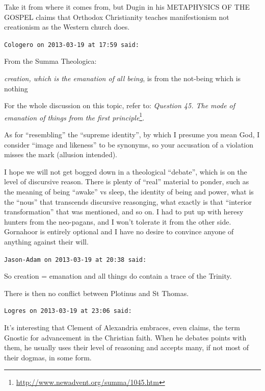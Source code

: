 \begin{footnotesize}
\begin{sffamily}
Take it from where it comes from, but Dugin in his METAPHYSICS OF THE GOSPEL claims that Orthodox Christianity teaches manifestionism not creationism as the Western church does.

\hfill

\texttt{Cologero on 2013-03-19 at 17:59 said:}

From the Summa Theologica:

\begin{quotex}

\emph{creation, which is the emanation of all being}, is from the not-being which is nothing
\end{quotex}

For the whole discussion on this topic, refer to: \textit{Question 45. The mode of emanation of things from the first principle}\footnote{\url{http://www.newadvent.org/summa/1045.htm}}.

As for ``resembling'' the ``supreme identity'', by which I presume you mean God, I consider ``image and likeness'' to be synonyms, so your accusation of a violation misses the mark (allusion intended).

I hope we will not get bogged down in a theological ``debate'', which is on the level of discursive reason. There is plenty of ``real'' material to ponder, such as the meaning of being ``awake'' vs sleep, the identity of being and power, what is the ``nous'' that transcends discursive reasonging, what exactly is that ``interior transformation'' that was mentioned, and so on. I had to put up with heresy hunters from the neo-pagans, and I won't tolerate it from the other side. Gornahoor is entirely optional and I have no desire to convince anyone of anything against their will.

\hfill

\texttt{Jason-Adam on 2013-03-19 at 20:38 said:}

So creation = emanation and all things do contain a trace of the Trinity.

There is then no conflict between Plotinus and St Thomas.

\hfill

\texttt{Logres on 2013-03-19 at 23:06 said:}

It's interesting that Clement of Alexandria embraces, even claims, the term Gnostic for advancement in the Christian faith. When he debates points with them, he usually uses their level of reasoning and accepts many, if not most of their dogmas, in some form.

\hfill


\end{sffamily}
\end{footnotesize}
